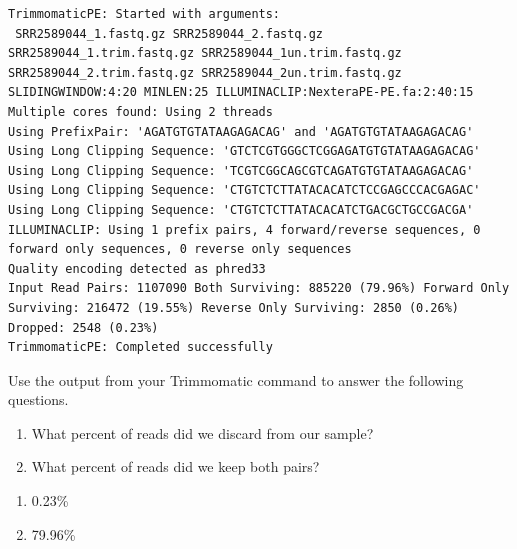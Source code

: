 \documentclass[
  letterpaper,
  DIV=11,
  numbers=noendperiod]{scrreprt}
\providecommand{\tightlist}{%
  \setlength{\itemsep}{0pt}\setlength{\parskip}{0pt}}\usepackage{longtable,booktabs,array}
\begin{document}
\begin{verbatim}
TrimmomaticPE: Started with arguments:
 SRR2589044_1.fastq.gz SRR2589044_2.fastq.gz SRR2589044_1.trim.fastq.gz SRR2589044_1un.trim.fastq.gz SRR2589044_2.trim.fastq.gz SRR2589044_2un.trim.fastq.gz SLIDINGWINDOW:4:20 MINLEN:25 ILLUMINACLIP:NexteraPE-PE.fa:2:40:15
Multiple cores found: Using 2 threads
Using PrefixPair: 'AGATGTGTATAAGAGACAG' and 'AGATGTGTATAAGAGACAG'
Using Long Clipping Sequence: 'GTCTCGTGGGCTCGGAGATGTGTATAAGAGACAG'
Using Long Clipping Sequence: 'TCGTCGGCAGCGTCAGATGTGTATAAGAGACAG'
Using Long Clipping Sequence: 'CTGTCTCTTATACACATCTCCGAGCCCACGAGAC'
Using Long Clipping Sequence: 'CTGTCTCTTATACACATCTGACGCTGCCGACGA'
ILLUMINACLIP: Using 1 prefix pairs, 4 forward/reverse sequences, 0 forward only sequences, 0 reverse only sequences
Quality encoding detected as phred33
Input Read Pairs: 1107090 Both Surviving: 885220 (79.96%) Forward Only Surviving: 216472 (19.55%) Reverse Only Surviving: 2850 (0.26%) Dropped: 2548 (0.23%)
TrimmomaticPE: Completed successfully
\end{verbatim}

\begin{tcolorbox}[enhanced jigsaw, toptitle=1mm, breakable, bottomrule=.15mm, colback=white, toprule=.15mm, opacityback=0, bottomtitle=1mm, coltitle=black, opacitybacktitle=0.6, rightrule=.15mm, colframe=quarto-callout-caution-color-frame, titlerule=0mm, colbacktitle=quarto-callout-caution-color!10!white, title={Exercise}, left=2mm, leftrule=.75mm, arc=.35mm]

Use the output from your Trimmomatic command to answer the following
questions.

\begin{enumerate}
\def\labelenumi{\arabic{enumi})}
\tightlist
\item
  What percent of reads did we discard from our sample?
\item
  What percent of reads did we keep both pairs?
\end{enumerate}

\end{tcolorbox}

\begin{tcolorbox}[enhanced jigsaw, toptitle=1mm, breakable, bottomrule=.15mm, colback=white, toprule=.15mm, opacityback=0, bottomtitle=1mm, coltitle=black, opacitybacktitle=0.6, rightrule=.15mm, colframe=quarto-callout-caution-color-frame, titlerule=0mm, colbacktitle=quarto-callout-caution-color!10!white, title={Solution}, left=2mm, leftrule=.75mm, arc=.35mm]

\begin{enumerate}
\def\labelenumi{\arabic{enumi})}
\tightlist
\item
  0.23\%
\item
  79.96\%
\end{enumerate}

\end{tcolorbox}
\end{document}
